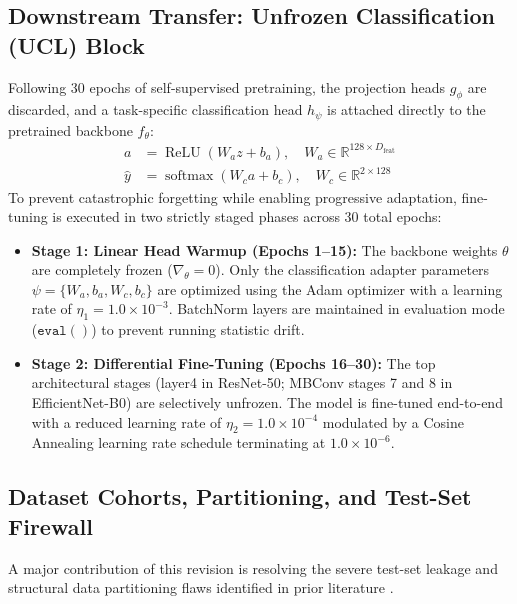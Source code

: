 \documentclass[journal,article,submit,moreauthors,pdftex]{Definitions/tsp}
\begin{document}
\subsection{Downstream Transfer: Unfrozen Classification (UCL) Block} \label{sect:s3dot5}
Following 30 epochs of self-supervised pretraining, the projection heads $g_\phi$ are discarded, and a task-specific classification head $h_\psi$ is attached directly to the pretrained backbone $f_\theta$:
\begin{align}
a &= \operatorname{ReLU}(W_a z + b_a), \quad W_a \in \mathbb{R}^{128 \times D_{\text{feat}}} \\
\hat{y} &= \operatorname{softmax}(W_c a + b_c), \quad W_c \in \mathbb{R}^{2 \times 128}
\end{align}
To prevent catastrophic forgetting while enabling progressive adaptation, fine-tuning is executed in two strictly staged phases across 30 total epochs:
\begin{itemize}
    \item \textbf{Stage 1: Linear Head Warmup (Epochs 1--15):} The backbone weights $\theta$ are completely frozen ($\nabla_\theta = 0$). Only the classification adapter parameters $\psi = \{W_a, b_a, W_c, b_c\}$ are optimized using the Adam optimizer with a learning rate of $\eta_1 = 1.0 \times 10^{-3}$. BatchNorm layers are maintained in evaluation mode ($\mathtt{eval}()$) to prevent running statistic drift.
    \item \textbf{Stage 2: Differential Fine-Tuning (Epochs 16--30):} The top architectural stages (layer4 in ResNet-50; MBConv stages 7 and 8 in EfficientNet-B0) are selectively unfrozen. The model is fine-tuned end-to-end with a reduced learning rate of $\eta_2 = 1.0 \times 10^{-4}$ modulated by a Cosine Annealing learning rate schedule terminating at $1.0 \times 10^{-6}$.
\end{itemize}

\subsection{Dataset Cohorts, Partitioning, and Test-Set Firewall} \label{sect:s3dot6}
A major contribution of this revision is resolving the severe test-set leakage and structural data partitioning flaws identified in prior literature \cite{Bundele24}.
\end{document}
